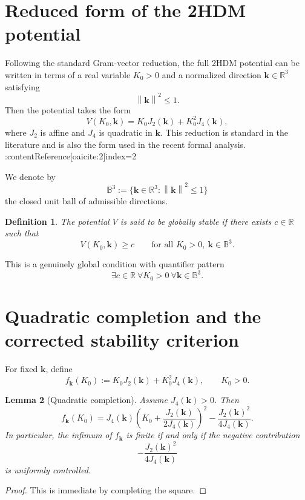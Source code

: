 \documentclass[11pt,a4paper]{article}
\newtheorem{definition}{Definition}[section]
\newtheorem{lemma}[definition]{Lemma}
\newcommand{\R}{\mathbb{R}}
\newcommand{\norm}[1]{\left\lVert #1 \right\rVert}
\newcommand{\kk}{\bm{k}}
\newcommand{\Sphere}{\mathbb{B}^3}
\begin{document}
	\section{Reduced form of the 2HDM potential}
	
	Following the standard Gram-vector reduction, the full 2HDM potential can be written in terms of a real variable \(K_0>0\) and a normalized direction \(\kk\in\R^3\) satisfying
	\[
	\norm{\kk}^2\le 1.
	\]
	Then the potential takes the form
	\begin{equation}\label{eq:reduced-potential}
		V(K_0,\kk)=K_0J_2(\kk)+K_0^2J_4(\kk),
	\end{equation}
	where \(J_2\) is affine and \(J_4\) is quadratic in \(\kk\). This reduction is standard in the literature and is also the form used in the recent formal analysis. :contentReference[oaicite:2]{index=2}
	
	We denote by
	\[
	\Sphere:=\{\kk\in\R^3:\norm{\kk}^2\le 1\}
	\]
	the closed unit ball of admissible directions.
	
	\begin{definition}
		The potential \(V\) is said to be \emph{globally stable} if there exists \(c\in\R\) such that
		\[
		V(K_0,\kk)\ge c
		\qquad
		\text{for all }K_0>0,\ \kk\in\Sphere.
		\]
	\end{definition}
	
	This is a genuinely global condition with quantifier pattern
	\[
	\exists c\in\R\ \forall K_0>0\ \forall \kk\in\Sphere.
	\]
	
	\section{Quadratic completion and the corrected stability criterion}
	
	For fixed \(\kk\), define
	\[
	f_{\kk}(K_0):=K_0J_2(\kk)+K_0^2J_4(\kk),\qquad K_0>0.
	\]
	
	\begin{lemma}[Quadratic completion]\label{lem:quadratic-completion}
		Assume \(J_4(\kk)>0\). Then
		\[
		f_{\kk}(K_0)
		=
		J_4(\kk)\left(K_0+\frac{J_2(\kk)}{2J_4(\kk)}\right)^2
		-\frac{J_2(\kk)^2}{4J_4(\kk)}.
		\]
		In particular, the infimum of \(f_{\kk}\) is finite if and only if the negative contribution
		\[
		-\frac{J_2(\kk)^2}{4J_4(\kk)}
		\]
		is uniformly controlled.
	\end{lemma}
	
	\begin{proof}
		This is immediate by completing the square.
	\end{proof}
	
\end{document}
